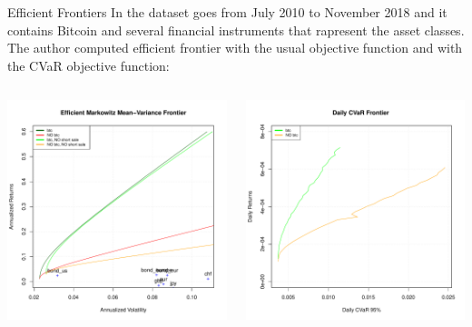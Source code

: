 \documentclass[c, 10pt]{beamer}
\begin{document}
\begin{frame}{Efficient Frontiers}
	In \cite{samuele} the dataset goes from July 2010 to November 2018 and it contains Bitcoin and several financial instruments that rapresent the asset classes. The author computed  efficient frontier with the usual objective function and with the CVaR objective function:
	\begin{columns}
		\begin{column}{0.5\textwidth}
			\includegraphics[width=\textwidth]{Images/efficient_frontier}
		\end{column}
		\begin{column}{0.5\textwidth}  %
			\includegraphics[width=\textwidth]{Images/efficient_frontier_CVaR}

\end{column}
\end{columns}
\end{frame}
\end{document}
